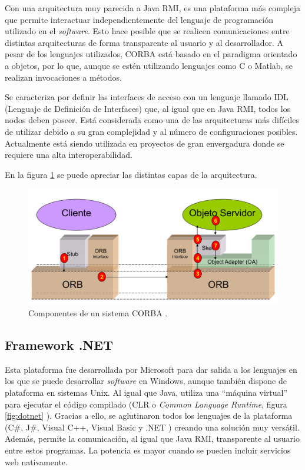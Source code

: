 Con una arquitectura muy parecida a Java RMI, es una plataforma más 
compleja que permite interactuar independientemente del lenguaje de 
programación utilizado en el \emph{software}. Esto hace posible que se 
realicen comunicaciones entre distintas arquitecturas de forma 
transparente al usuario y al desarrollador. A pesar de los lenguajes 
utilizados, CORBA está basado en el paradigma orientado a objetos, por 
lo que, aunque se estén utilizando lenguajes como C o Matlab, se 
realizan invocaciones a métodos.

Se caracteriza por definir las interfaces de acceso con un lenguaje 
llamado IDL (Lenguaje de Definición de Interfaces) que, al igual que 
en Java RMI, todos los nodos deben poseer. Está considerada como una 
de las arquitecturas más difíciles de utilizar debido a su gran 
complejidad y al número de configuraciones posibles. Actualmente está 
siendo utilizada en proyectos de gran envergadura donde se requiere 
una alta interoperabilidad.

En la figura \ref{fig:corba} se puede apreciar las distintas capas de 
la arquitectura.

\begin{figure}[h]
	\centering
	\includegraphics[scale=0.3]{images/corba.png}
	\caption[Estructura de CORBA]{Componentes de un sistema CORBA \cite{DAD}.}
	\label{fig:corba}
\end{figure}

\subsection{Framework .NET}
Esta plataforma fue desarrollada por Microsoft para dar salida a los 
lenguajes en los que se puede desarrollar \emph{software} en Windows, 
aunque también dispone de plataforma en sistemas Unix. Al igual que 
Java, utiliza una ``máquina virtual'' para ejecutar el código 
compilado (CLR o \emph{Common Language Runtime}, figura \ref{fig:dotnet} \cite{dotNet}). 
Gracias a ello, se aglutinaron todos los lenguajes de la plataforma 
(C\#, J\#, Visual C++, Visual Basic y .NET ) 
creando una solución muy versátil. Además, permite la comunicación, 
al igual que Java RMI, transparente 
al usuario entre estos programas. La potencia es mayor cuando se 
pueden incluir servicios web nativamente.

